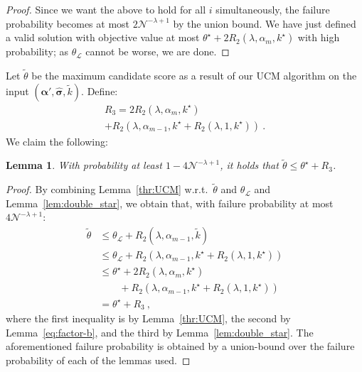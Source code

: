 \documentclass[letterpaper]{article} %
\newtheorem{lemma}[theorem]{Lemma}
\theoremstyle{definition}
\newcommand{\NN}{\mathcal{N}}
\newcommand{\LL}{\mathcal{L}}
\newcommand\vecgreek{\bm}
\newcommand{\veca}{\vecgreek{\alpha}}
\begin{document}
\begin{proof}
	Since we want the above to hold for all $i$ simultaneously, the failure probability becomes at most $2\NN^{-\lambda+1}$ by the union bound.
	We have just defined a valid solution with objective value at most $\theta^\star  +   2R_2(\lambda, \alpha_{m},k^\star)$ with high probability; as $\theta_{\LL}$ cannot be worse, we are done.
\end{proof}


Let $\tilde{\theta}$ be the maximum candidate score as a result of our UCM algorithm on the input $(\veca', \hat{\vecgreek{\sigma}}, \tilde{k})$. Define: 
\begin{multline*}
	R_3=2R_2(\lambda, \alpha_{m},k^\star ) \\
	+R_2(\lambda, \alpha_{m-1},k^\star + R_2(\lambda, 1,k^\star))\ .
\end{multline*}
We claim the following:
\begin{lemma}\label{lem:tt}
	With probability at least $1-4\NN^{-\lambda + 1}$, it holds that $\tilde{\theta} \leq \theta^\star  + 	R_3$.
\end{lemma}

\begin{proof}
	By combining Lemma~\ref{thr:UCM} w.r.t.\ $\tilde{\theta}$ and $\theta_{\LL}$ and Lemma~\ref{lem:double_star}, we obtain that, with failure probability at most $4\NN^{-\lambda + 1}$:
	\begin{align*}
	\tilde{\theta} &\leq \theta_{\LL} + R_2(\lambda, \alpha_{m-1},\tilde{k})\\
	&\leq \theta_{\LL} + R_2(\lambda, \alpha_{m-1},k^\star + R_2(\lambda, 1,k^\star))\\
	&\leq  \theta^\star  + 2R_2(\lambda, \alpha_{m},k^\star )\\
	&\qquad +R_2(\lambda, \alpha_{m-1},k^\star + R_2(\lambda, 1,k^\star))\\
	&= \theta^\star  + 	R_3\ ,
	\end{align*}
	where the first inequality is by Lemma~\ref{thr:UCM}, the second by Lemma~\ref{eq:factor-b}, 
and the third by
	Lemma~\ref{lem:double_star}. The aforementioned failure probability is obtained by a union-bound over the failure probability of each of the lemmas used. 
\end{proof}
\end{document}
